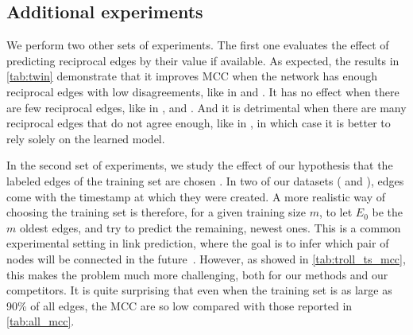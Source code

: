 



\subsection{Additional experiments}
  
We perform two other sets of experiments. The first one evaluates the effect of predicting reciprocal
edges by their value if available. As expected, the results in \autoref{tab:twin} demonstrate that
it improves MCC when the network has enough reciprocal edges with low disagreements, like in \sla{} and
\epi{}. It has no effect when there are few reciprocal edges, like in \aut{}, \wik{} and \kiw{}. And it is
detrimental when there are many reciprocal edges that do not agree enough, like in \adv{}, in which
case it is better to rely solely on the learned model.



In the second set of experiments, we study the effect of our hypothesis that the labeled edges of the training set are
chosen \uar{}. In two of our datasets (\wik{} and \epi{}), edges come with the timestamp at which they
were created. A more realistic way of choosing the training set is therefore, for a given training
size $m$, to let $E_0$ be the $m$ oldest edges, and try to predict the remaining, newest ones. This
is a common experimental setting in link prediction, where the goal is to infer which pair of nodes
will be connected in the future~\autocite{linkPredSurvey16}. However, as showed in
\autoref{tab:troll_ts_mcc}, this makes the problem much more challenging, both for our methods and
our competitors. It is quite surprising that even when the training set is as large as 90\% of all
edges, the MCC are so low compared with those reported in \autoref{tab:all_mcc}.



